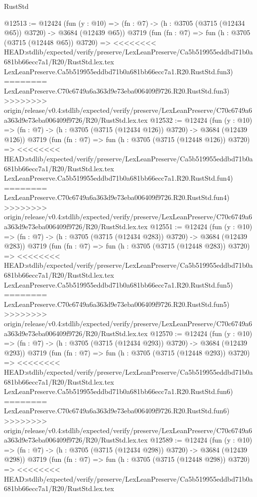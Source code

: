\begin{lexlean}{RustStd}
\begin{coremodule}
{\begin{coremodule}
{{{{{{{{{{{{{{@12513 := @12424
    (fun (y : @10) => (fn : @7) -> (h : @3705 (@3715 (@12434 @65)) @3720) -> @3684 (@12439 @65))
    @3719
    (fun (fn : @7) =>
    fun (h : @3705 (@3715 (@12448 @65)) @3720) =>
<<<<<<<< HEAD:stdlib/expected/verify/preserve/LexLeanPreserve/Ca5b519955eddbd71b0a681bb66ecc7a1/R20/RustStd.lex.tex
    LexLeanPreserve.Ca5b519955eddbd71b0a681bb66ecc7a1.R20.RustStd.fun3)
========
    LexLeanPreserve.C70c6749a6a363d9e73eba006409f9726.R20.RustStd.fun3)
>>>>>>>> origin/release/v0.4:stdlib/expected/verify/preserve/LexLeanPreserve/C70c6749a6a363d9e73eba006409f9726/R20/RustStd.lex.tex
@12532 := @12424
    (fun (y : @10) => (fn : @7) -> (h : @3705 (@3715 (@12434 @126)) @3720) -> @3684 (@12439 @126))
    @3719
    (fun (fn : @7) =>
    fun (h : @3705 (@3715 (@12448 @126)) @3720) =>
<<<<<<<< HEAD:stdlib/expected/verify/preserve/LexLeanPreserve/Ca5b519955eddbd71b0a681bb66ecc7a1/R20/RustStd.lex.tex
    LexLeanPreserve.Ca5b519955eddbd71b0a681bb66ecc7a1.R20.RustStd.fun4)
========
    LexLeanPreserve.C70c6749a6a363d9e73eba006409f9726.R20.RustStd.fun4)
>>>>>>>> origin/release/v0.4:stdlib/expected/verify/preserve/LexLeanPreserve/C70c6749a6a363d9e73eba006409f9726/R20/RustStd.lex.tex
@12551 := @12424
    (fun (y : @10) => (fn : @7) -> (h : @3705 (@3715 (@12434 @283)) @3720) -> @3684 (@12439 @283))
    @3719
    (fun (fn : @7) =>
    fun (h : @3705 (@3715 (@12448 @283)) @3720) =>
<<<<<<<< HEAD:stdlib/expected/verify/preserve/LexLeanPreserve/Ca5b519955eddbd71b0a681bb66ecc7a1/R20/RustStd.lex.tex
    LexLeanPreserve.Ca5b519955eddbd71b0a681bb66ecc7a1.R20.RustStd.fun5)
========
    LexLeanPreserve.C70c6749a6a363d9e73eba006409f9726.R20.RustStd.fun5)
>>>>>>>> origin/release/v0.4:stdlib/expected/verify/preserve/LexLeanPreserve/C70c6749a6a363d9e73eba006409f9726/R20/RustStd.lex.tex
@12570 := @12424
    (fun (y : @10) => (fn : @7) -> (h : @3705 (@3715 (@12434 @293)) @3720) -> @3684 (@12439 @293))
    @3719
    (fun (fn : @7) =>
    fun (h : @3705 (@3715 (@12448 @293)) @3720) =>
<<<<<<<< HEAD:stdlib/expected/verify/preserve/LexLeanPreserve/Ca5b519955eddbd71b0a681bb66ecc7a1/R20/RustStd.lex.tex
    LexLeanPreserve.Ca5b519955eddbd71b0a681bb66ecc7a1.R20.RustStd.fun6)
========
    LexLeanPreserve.C70c6749a6a363d9e73eba006409f9726.R20.RustStd.fun6)
>>>>>>>> origin/release/v0.4:stdlib/expected/verify/preserve/LexLeanPreserve/C70c6749a6a363d9e73eba006409f9726/R20/RustStd.lex.tex
@12589 := @12424
    (fun (y : @10) => (fn : @7) -> (h : @3705 (@3715 (@12434 @298)) @3720) -> @3684 (@12439 @298))
    @3719
    (fun (fn : @7) =>
    fun (h : @3705 (@3715 (@12448 @298)) @3720) =>
<<<<<<<< HEAD:stdlib/expected/verify/preserve/LexLeanPreserve/Ca5b519955eddbd71b0a681bb66ecc7a1/R20/RustStd.lex.tex
}}}}}}}}}}}}}}
\end{coremodule}}
\end{coremodule}
\end{lexlean}

